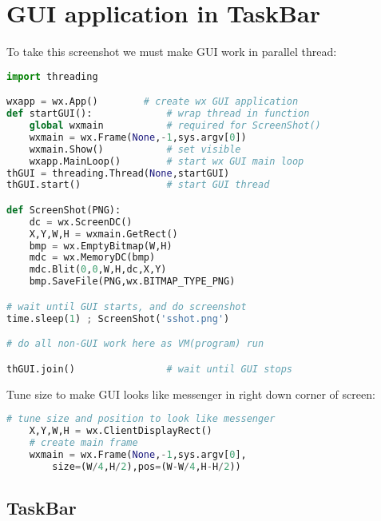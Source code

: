 \chapter{GUI application in TaskBar}\clearpage

To take this screenshot we must make GUI work in parallel thread:
\begin{lstlisting}[language=python]
import threading

wxapp = wx.App()		# create wx GUI application
def startGUI():				# wrap thread in function
	global wxmain			# required for ScreenShot()
	wxmain = wx.Frame(None,-1,sys.argv[0])
	wxmain.Show()			# set visible
	wxapp.MainLoop()		# start wx GUI main loop
thGUI = threading.Thread(None,startGUI)
thGUI.start()				# start GUI thread

def ScreenShot(PNG):
	dc = wx.ScreenDC()
	X,Y,W,H = wxmain.GetRect()
	bmp = wx.EmptyBitmap(W,H)
	mdc = wx.MemoryDC(bmp)
	mdc.Blit(0,0,W,H,dc,X,Y)
	bmp.SaveFile(PNG,wx.BITMAP_TYPE_PNG)

# wait until GUI starts, and do screenshot
time.sleep(1) ; ScreenShot('sshot.png')

# do all non-GUI work here as VM(program) run

thGUI.join()				# wait until GUI stops
\end{lstlisting}

Tune size to make GUI looks like messenger in right down corner of screen:
\begin{lstlisting}[language=python]
	# tune size and position to look like messenger
	X,Y,W,H = wx.ClientDisplayRect()
	# create main frame
	wxmain = wx.Frame(None,-1,sys.argv[0],
		size=(W/4,H/2),pos=(W-W/4,H-H/2))
\end{lstlisting}

\section{TaskBar}

